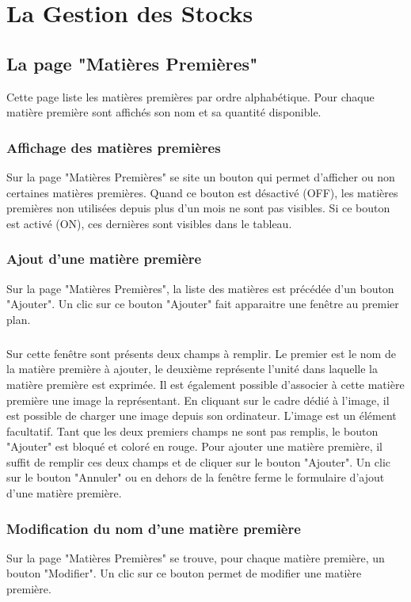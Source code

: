 \chapter{La Gestion des Stocks}

\section{La page "Matières Premières"}
Cette page liste les matières premières par ordre alphabétique. Pour chaque 
matière première sont affichés son nom et sa quantité disponible.

\subsection{Affichage des matières premières}
Sur la page "Matières Premières" se site un bouton qui permet d'afficher ou non 
certaines matières premières. Quand ce bouton est désactivé (OFF), les matières 
premières non utilisées depuis plus d'un mois ne sont pas visibles. Si ce bouton
 est activé (ON), ces dernières sont visibles dans le tableau.


\subsection{Ajout d'une matière première}
Sur la page "Matières Premières", la liste des matières est précédée d'un bouton
 "Ajouter". 
Un clic sur ce bouton "Ajouter" fait apparaitre une fenêtre au premier plan. 

\paragraph{}
Sur cette fenêtre sont présents deux champs à remplir. Le premier est le nom de 
la matière première à ajouter, le deuxième représente l'unité dans laquelle la 
matière première est exprimée. Il est également possible d'associer à cette 
matière première une image la représentant. En cliquant sur le cadre dédié à 
l'image, il est possible de charger une image depuis son ordinateur. L'image est
un élément facultatif. Tant que les deux premiers champs ne sont pas remplis, 
le bouton "Ajouter" est bloqué et coloré en rouge. Pour ajouter une matière 
première, il suffit de remplir ces deux champs et de cliquer sur le bouton 
"Ajouter". Un clic sur le bouton "Annuler" ou en dehors de la fenêtre ferme 
le formulaire d'ajout d'une matière première.


\subsection{Modification du nom d'une matière première}
Sur la page "Matières Premières" se trouve, pour chaque matière première, 
un bouton "Modifier". Un clic sur ce bouton permet de modifier une matière 
première.

